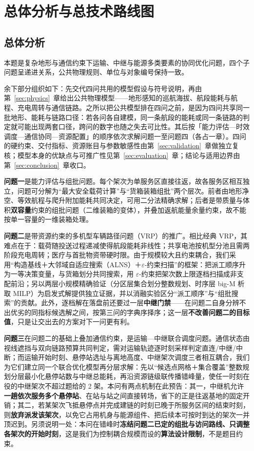 \section{总体分析与总技术路线图}

\subsection{总体分析}

本题是复杂地形与通信约束下运输、中继与能源多类要素的协同优化问题，四个子问题呈递进关系，公共物理规则、单位与对象编号保持一致。

余下部分组织如下：先交代四问共用的模型假设与符号说明，再由第~\ref{sec:physics}~章给出公共物理模型——地形感知的巡航海拔、航段能耗与航程、充电周转与通信链路。之所以把公共模型排在四问之前，是因为四问共享同一批地形、能耗与链路口径：若各问各自建模，同一条航段的能耗或同一条链路的判定就可能出现两套口径，跨问的数字也随之失去可比性。其后按「能力评估—时效调度—通信协同—资源配置」的顺序依次求解问题一至问题四（各占一章）。四问的硬约束、交付指标、资源账目与参数敏感性由第~\ref{sec:validation}~章做独立复核；模型本身的优缺点与可推广性见第~\ref{sec:evaluation}~章；结论与适用边界由第~\ref{sec:conclusion}~章收口。

\textbf{问题一}是能力评估与组批问题。每个架次为单服务区直接往返，故各服务区相互独立，问题可分解为“最大安全载荷计算”与“货箱装箱组批”两个层次。前者由地形净空、等效航程与爬升附加能耗共同决定，可用二分法精确求解；后者是带质量与体积\textbf{双容量}约束的组批问题（二维装箱的变体），并叠加返航能量余量约束，故不能按单一容量的一维装箱处理。

\textbf{问题二}是带资源约束的多机型车辆路径问题（VRP）的推广。相比经典 VRP，其难点在于：载荷随投送过程递减使得航段能耗非线性；共享电池按机型分池且需两阶段充电周转；医疗与首批物资带硬时限。由于规模较大且约束耦合，我们采用“构造基线＋大邻域自适应搜索（ALNS）＋$\varepsilon$-约束扫描”的框架：把派工顺序升为一等决策变量，与货箱划分共同搜索，用 $\varepsilon$-约束把架次数上限逐档扫描成非支配前沿；另以两层小规模精确验证（分区层集合划分整数规划、时序层 big-M 析取 MILP）为启发式解提供独立证据，并以消融实验区分“派工顺序”与“组批搜索”的贡献。此外，逐档解在落盘前还要过一层\textbf{中继门禁}——在问题二自身分辨不出优劣的同指标候选解之间，按第三问的字典序择序；这一层\textbf{不改善问题二的目标值}，只是让交出去的方案对下一问更有利。

\textbf{问题三}在问题二的基础上叠加通信约束，是运输—中继联合调度问题。通信状态由视线遮挡与双向链路预算共同判定\cite{itu2024p525}，需对运输轨迹逐时刻采样判定直连/中继/中断；而运输开始时刻、悬停站选址与离地高度、中继架次调度三者相互耦合，我们为它们建立同一个联合优化模型再分层求解：先以“候选点网格＋集合覆盖”整数规划分层最小化悬停站数与中继总能耗，再沿资源链级联传播错峰量，使任一时刻在役的中继架次不超过题给的 2 架。本问有两点机制在此预告：其一，中继机允许\textbf{一趟依次服务多个悬停站}、在站与站之间直接转场，省下的正是往返基地的固定开销；其二，若某架次飞抵悬停点并完成建链的时刻已晚于所服务区间的结束时刻，则\textbf{放弃派发该架次}，以免它占用机身与能源组件、把后续本可按时到达的架次一并顶迟到。另须说明一处：本问在错峰时\textbf{冻结问题二已定的组批与访问路线、只调整各架次的开始时刻}，这是我们为控制耦合规模而设的\textbf{算法设计限制}，不是题目约束。

